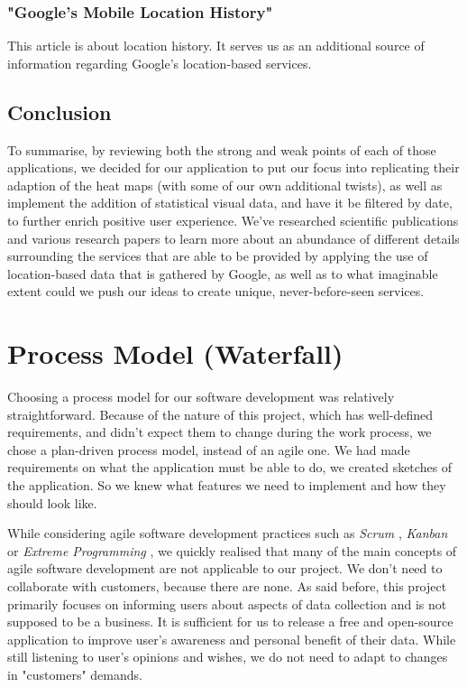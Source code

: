 \documentclass[12p]{article}
\begin{document}
\subsubsection["Google’s Mobile Location History"]{"Google’s Mobile Location History" \cite{GooglesMobileArtc}}

This article is about location history. It serves us as an additional source of information regarding Google's location-based services.

\newpage
\subsection{Conclusion}

To summarise, by reviewing both the strong and weak points of each of those applications, we decided for our application to put our focus into replicating their adaption of the heat maps (with some of our own additional twists), as well as implement the addition of statistical visual data, and have it be filtered by date, to further enrich positive user experience. We've researched scientific publications and various research papers to learn more about an abundance of different details surrounding the services that are able to be provided by applying the use of location-based data that is gathered by Google, as well as to what imaginable extent could we push our ideas to create unique, never-before-seen services.


\newpage
\section{Process Model (Waterfall)} \label{sec:ProcessModel}

Choosing a process model for our software development was relatively straightforward. Because of the nature of this project, which has well-defined requirements, and didn't expect them to change during the work process, we chose a plan-driven process model, instead of an agile one. We had made requirements on what the application must be able to do, we created sketches of the application. So we knew what features we need to implement and how they should look like.

While considering agile software development practices such as \textit{Scrum} \cite{Scrum}, \textit{Kanban} \cite{Kanban} or \textit{Extreme Programming} \cite{ExtremeProgramming}, we quickly realised that many of the main concepts of agile software development are not applicable to our project. 
We don't need to collaborate with customers, because there are none. As said before, this project primarily focuses on informing users about aspects of data collection and is not supposed to be a business. It is sufficient for us to release a free and open-source application to improve user's awareness and personal benefit of their data. While still listening to user's opinions and wishes, we do not need to adapt to changes in "customers" demands.
\end{document}
